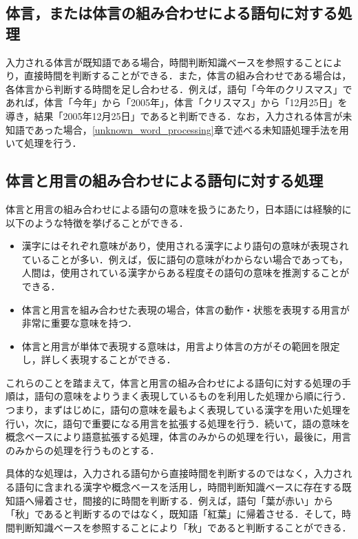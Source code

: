 \subsection{体言，または体言の組み合わせによる語句に対する処理}
入力される体言が既知語である場合，時間判断知識ベースを参照することにより，直接時間を判断することができる．また，体言の組み合わせである場合は，各体言から判断する時間を足し合わせる．例えば，語句「今年のクリスマス」であれば，体言「今年」から「2005年」，体言「クリスマス」から「12月25日」を導き，結果「2005年12月25日」であると判断できる．なお，入力される体言が未知語であった場合，\ref{unknown_word_processing}章で述べる未知語処理手法を用いて処理を行う．


\subsection{体言と用言の組み合わせによる語句に対する処理}
体言と用言の組み合わせによる語句の意味を扱うにあたり，日本語には経験的に以下のような特徴を挙げることができる．

\begin{itemize}
\item 漢字にはそれぞれ意味があり，使用される漢字により語句の意味が表現されていることが多い．例えば，仮に語句の意味がわからない場合であっても，人間は，使用されている漢字からある程度その語句の意味を推測することができる．
\item 体言と用言を組み合わせた表現の場合，体言の動作・状態を表現する用言が非常に重要な意味を持つ．
\item 体言と用言が単体で表現する意味は，用言より体言の方がその範囲を限定し，詳しく表現することができる．
\end{itemize}

これらのことを踏まえて，体言と用言の組み合わせによる語句に対する処理の手順は，語句の意味をよりうまく表現しているものを利用した処理から順に行う．つまり，まずはじめに，語句の意味を最もよく表現している漢字を用いた処理を行い，次に，語句で重要になる用言を拡張する処理を行う．続いて，語の意味を概念ベースにより語意拡張する処理，体言のみからの処理を行い，最後に，用言のみからの処理を行うものとする．

具体的な処理は，入力される語句から直接時間を判断するのではなく，入力される語句に含まれる漢字や概念ベースを活用し，時間判断知識ベースに存在する既知語へ帰着させ，間接的に時間を判断する．例えば，語句「葉が赤い」から「秋」であると判断するのではなく，既知語「紅葉」に帰着させる．そして，時間判断知識ベースを参照することにより「秋」であると判断することができる．

